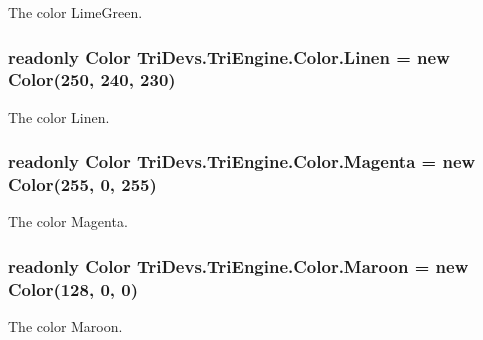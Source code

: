 The color Lime\-Green. 

\hypertarget{struct_tri_devs_1_1_tri_engine_1_1_color_a3f1151f59eb1a9ada08341f3a1c6db21}{
\subsubsection[{Linen}]{\setlength{\rightskip}{0pt plus 5cm}readonly {\bf Color} Tri\-Devs.\-Tri\-Engine.\-Color.\-Linen = new {\bf Color}(250, 240, 230)\hspace{0.3cm}{\ttfamily [static]}}}\label{struct_tri_devs_1_1_tri_engine_1_1_color_a3f1151f59eb1a9ada08341f3a1c6db21}


The color Linen. 

\hypertarget{struct_tri_devs_1_1_tri_engine_1_1_color_aed285d74a7434212626e08aa320f050d}{
\subsubsection[{Magenta}]{\setlength{\rightskip}{0pt plus 5cm}readonly {\bf Color} Tri\-Devs.\-Tri\-Engine.\-Color.\-Magenta = new {\bf Color}(255, 0, 255)\hspace{0.3cm}{\ttfamily [static]}}}\label{struct_tri_devs_1_1_tri_engine_1_1_color_aed285d74a7434212626e08aa320f050d}


The color Magenta. 

\hypertarget{struct_tri_devs_1_1_tri_engine_1_1_color_aee8f74c09cc6f1f4b4ec7b7b16488bb2}{
\subsubsection[{Maroon}]{\setlength{\rightskip}{0pt plus 5cm}readonly {\bf Color} Tri\-Devs.\-Tri\-Engine.\-Color.\-Maroon = new {\bf Color}(128, 0, 0)\hspace{0.3cm}{\ttfamily [static]}}}\label{struct_tri_devs_1_1_tri_engine_1_1_color_aee8f74c09cc6f1f4b4ec7b7b16488bb2}


The color Maroon. 

